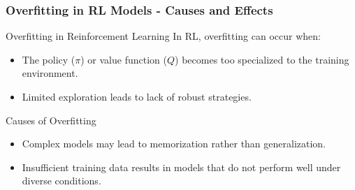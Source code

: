 \documentclass[aspectratio=169]{beamer}
\begin{document}
\begin{frame}[fragile]
    \frametitle{Overfitting in RL Models - Causes and Effects}
    \begin{block}{Overfitting in Reinforcement Learning}
        In RL, overfitting can occur when:
        \begin{itemize}
            \item The policy (\(\pi\)) or value function (\(Q\)) becomes too specialized to the training environment.
            \item Limited exploration leads to lack of robust strategies.
        \end{itemize}
    \end{block}
    
    \begin{block}{Causes of Overfitting}
        \begin{itemize}
            \item Complex models may lead to memorization rather than generalization.
            \item Insufficient training data results in models that do not perform well under diverse conditions.
        \end{itemize}
    \end{block}
\end{frame}
\end{document}
